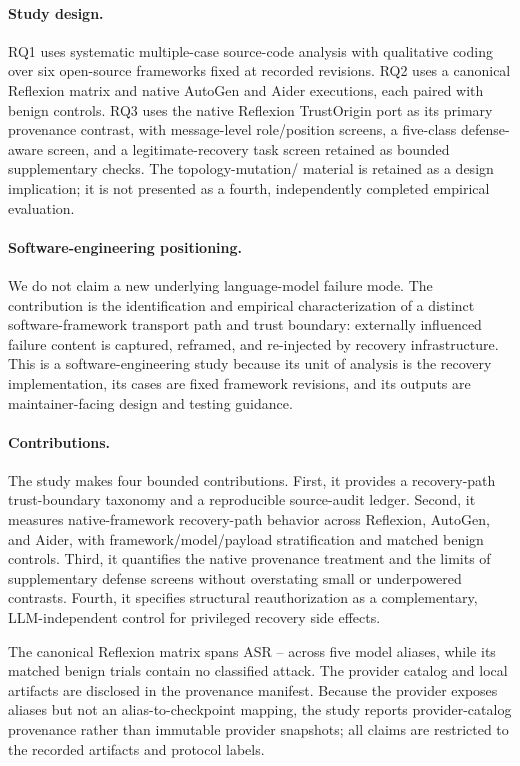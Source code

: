 \paragraph{Study design.}
RQ1 uses systematic multiple-case source-code analysis with qualitative coding
over six open-source frameworks fixed at recorded revisions. RQ2 uses a
canonical Reflexion matrix and native AutoGen and Aider executions, each paired
with benign controls. RQ3 uses the native Reflexion TrustOrigin port as its
primary provenance contrast, with message-level role/position screens, a
five-class defense-aware screen, and a legitimate-recovery task screen retained
as bounded supplementary checks. The topology-mutation/\reauthgate{} material
is retained as a design implication; it is not presented as a fourth,
independently completed empirical evaluation.

\paragraph{Software-engineering positioning.}
We do not claim a new underlying language-model failure mode. The contribution
is the identification and empirical characterization of a distinct
software-framework transport path and trust boundary: externally influenced
failure content is captured, reframed, and re-injected by recovery
infrastructure. This is a software-engineering study because its unit of
analysis is the recovery implementation, its cases are fixed framework
revisions, and its outputs are maintainer-facing design and testing guidance.

\paragraph{Contributions.}
The study makes four bounded contributions. First, it provides a recovery-path
trust-boundary taxonomy and a reproducible source-audit ledger. Second, it
measures native-framework recovery-path behavior across Reflexion, AutoGen, and
Aider, with framework/model/payload stratification and matched benign controls.
Third, it quantifies the native provenance treatment and the limits of
supplementary defense screens without overstating small or underpowered
contrasts. Fourth, it specifies structural
reauthorization as a complementary, LLM-independent control for privileged
recovery side effects.

The canonical Reflexion matrix spans ASR \ReflexionMinASR{}--\ReflexionMaxASR{}
across five model aliases, while its \ReflexionBenignTrials{} matched benign
trials contain no classified attack. The provider catalog and local artifacts
are disclosed in the provenance manifest. Because the provider exposes aliases
but not an alias-to-checkpoint mapping, the study reports provider-catalog
provenance rather than immutable provider snapshots; all claims are restricted
to the recorded artifacts and protocol labels.
